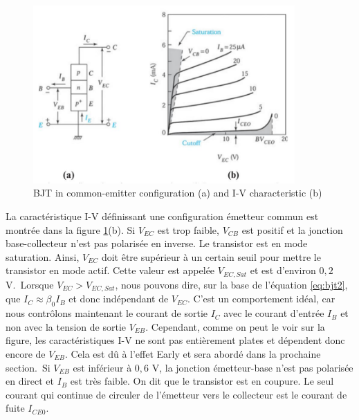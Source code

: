 \begin{figure}[h!]
\centering
\includegraphics[width=10cm]{figures/ch01/bjt6.jpg}
\caption{BJT in common-emitter configuration (a) and I-V characteristic (b)} 
\label{fig:bjt6}
\end{figure}

La caractéristique I-V définissant une configuration émetteur commun est montrée dans la figure \ref{fig:bjt6}(b). Si $V_{EC}$ est trop faible, $V_{CB}$ est positif et la jonction base-collecteur n'est pas polarisée en inverse. Le transistor est en mode saturation. Ainsi, $V_{EC}$ doit être supérieur à un certain seuil pour mettre le transistor en mode actif. Cette valeur est appelée $V_{EC, Sat}$ et est d'environ $0,2$ V.\
Lorsque $V_{EC} > V_{EC, Sat}$, nous pouvons dire, sur la base de l'équation \ref{eq:bjt2}, que $I_C \approx \beta_0 I_B$ et donc indépendant de $V_{EC}$. C'est un comportement idéal, car nous contrôlons maintenant le courant de sortie $I_C$ avec le courant d'entrée $I_B$ et non avec la tension de sortie $V_{EB}$. Cependant, comme on peut le voir sur la figure, les caractéristiques I-V ne sont pas entièrement plates et dépendent donc encore de $V_{EB}$. Cela est dû à l'effet Early et sera abordé dans la prochaine section.\
Si $V_{EB}$ est inférieur à $0,6$ V, la jonction émetteur-base n'est pas polarisée en direct et $I_B$ est très faible. On dit que le transistor est en coupure. Le seul courant qui continue de circuler de l'émetteur vers le collecteur est le courant de fuite $I_{CE0}$.

